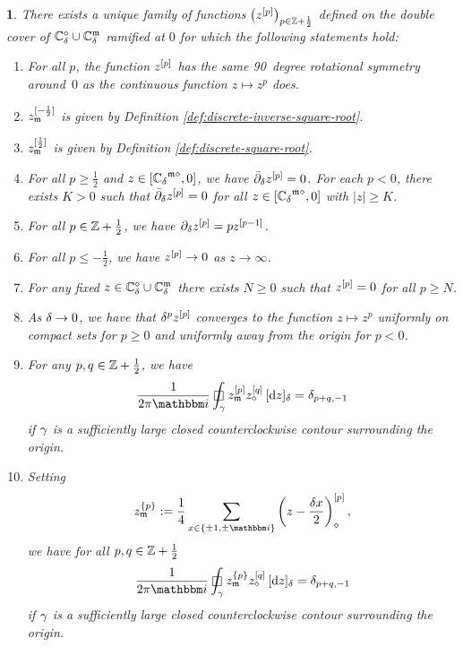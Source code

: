 \documentclass[12pt,oneside,english]{amsart}
\numberwithin{equation}{section}
\numberwithin{figure}{section}
\theoremstyle{plain}
\theoremstyle{plain}
\theoremstyle{plain}
\newtheorem{prop}[thm]{\protect\propositionname}
\theoremstyle{plain}
\theoremstyle{remark}
\theoremstyle{definition}
\theoremstyle{plain}
\theoremstyle{plain}
\numberwithin{thm}{section}
\providecommand{\propositionname}{Proposition}
\providecommand{\propositionname}{Proposition}
\providecommand{\propositionname}{Proposition}
\providecommand{\propositionname}{Proposition}
\begin{document}
\begin{prop}
\label{prop:half-integer-monomials}There exists a unique family of
functions $\left({z^{[{p}]}} \right)_{p\in\mathbb{Z} +\frac{1}{2}}$
defined on the double cover of 
${\mathbb{C}_{{\delta}}^{\diamond}}\cup{\mathbb{C}_{{\delta}}^{\mathfrak{m}}}$
ramified at $0$ for which the following statements hold: 
\begin{enumerate}
\item For all $p$, the function ${z^{[{p}]}} $ has the same 90~degree 
rotational symmetry around~$0$ as the continuous function
$z\mapsto z^{p}$ does. 
\item ${z_{\mathfrak{m}}^{[{-\frac{1}{2}}]}}$ is given by Definition 
\ref{def:discrete-inverse-square-root}. 
\item ${z_{\mathfrak{m}}^{[{\frac{1}{2}}]}}$ is given by Definition 
\ref{def:discrete-square-root}. 
\item
For all $p\geq\frac{1}{2}$ and
$z \in {\left[  {\mathbb{C}_{{\delta}}}^{\mathfrak{m}\diamond}, 0 \right]}$,
we have
${{\bar{\partial}}}_{{\delta}} {z^{[{p}]}} =0$. For each $p<0$, there 
exists $K>0$ such that ${{\bar{\partial}}}_{{\delta}} {z^{[{p}]}} = 0$ for all 
$z \in {\left[ {\mathbb{C}_{{\delta}}}^{\mathfrak{m}\diamond}, 0 \right]}$
with $\left|z\right|\geq K$. 
\item
For all $p \in \mathbb{Z} + \frac{1}{2}$, we have
${\partial}_{{\delta}} {z^{[{p}]}} = p {z^{[{p-1}]}}$. 
\item For all $p\leq-\frac{1}{2}$, we have
${z^{[{p}]}} \to 0$ as $z \to \infty$. 
\item For any fixed $z\in{\mathbb{C}_{{\delta}}^{\diamond}}\cup {\mathbb{C}_{{\delta}}^{\mathfrak{m}}} $ there
exists $N\geq0$ such that ${z^{[{p}]}} =0$ for all $p\geq N$. 
\item As $ {\delta}  \to 0$, we have that $ {\delta}^{p} {z^{[{p}]}} $ 
converges to the function
$z\mapsto z^{p}$ uniformly on compact sets for $p\geq0$
and uniformly away from the origin for $p<0$. 
\item For any $p,q\in\mathbb{Z} + \frac{1}{2}$, we have
\[ \frac{1}{2\pi \ii } \dcint{\contour}
    \dmon{z_{\mdl}}{p}
    \dmon{z_{\dmd}}{q} \, \dd{z}
= \delta_{p+q,-1} \]
if $\gamma$ is a sufficiently large closed counterclockwise contour
surrounding the origin.
\item Setting
\[ \dhimonavg{z_{\mdl}}{p} := \frac{1}{4}\sum_{x\in\left\{ 
\pm1,\pm \ii \right\} }\left(z-\frac{ \meshsz 
x}{2}\right)_{\dmd}^{[p]} , \]
we have for all $p,q \in \mathbb{Z} + \frac{1}{2}$
\[ \frac{1}{2\pi \ii }\dcint{\contour}
    \dhimonavg{z_{\mdl}}{p} \dhimon{z_{\dmd}}{q} \, \dd{z}
= \delta_{p+q,-1} \]
if $\gamma$ is a sufficiently large closed counterclockwise contour
surrounding the origin.
\end{enumerate}
\end{prop}
\end{document}

